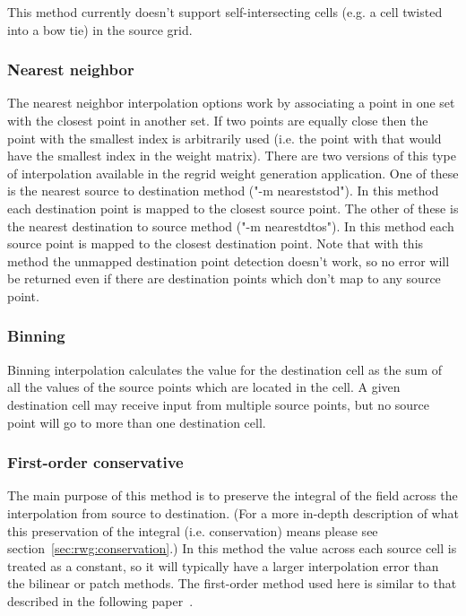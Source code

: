 This method currently doesn't support self-intersecting cells (e.g. a cell twisted into a bow tie) in the source grid.

\subsubsection{Nearest neighbor}\label{sec:rwg_nearest}
The nearest neighbor interpolation options work by associating a point in one set with the closest point in another set. If two points are equally
close then the point with the smallest index is arbitrarily used (i.e. the point with that would have the smallest index in the weight matrix). There are two
versions of this type of interpolation available in the regrid weight generation application. One of these is the nearest source to destination
method ("-m neareststod"). In this method each destination point is mapped to the closest source point. The other of these is the
nearest destination to source method ("-m nearestdtos"). In this method each source point is mapped to the closest destination point. Note
that with this method the unmapped destination point detection doesn't work, so no error will be returned even if there are destination points
which don't map to any source point.

\subsubsection{Binning}\label{sec:rwg_binning}
Binning interpolation calculates the value for the destination cell as the sum of all the values of the source points which are located in the cell.  A given destination cell may receive input from multiple source points, but no source point will go to more than one destination cell.

\subsubsection{First-order conservative}\label{sec:rwg_conserve}
 The main purpose of this method is to preserve the integral of the field across the interpolation from source to destination.  
 (For a more in-depth description of what this preservation of the integral (i.e. conservation) means please see section~\ref{sec:rwg:conservation}.)  In this method the value across each source cell is treated as a constant, so it will typically have a larger 
 interpolation error than the bilinear or patch methods.  The first-order method used here is similar to that described in the following paper~\cite{ConservativeOrder1}.

